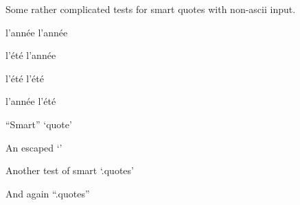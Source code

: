 
\def\mytitle{SmartQuotes Test}


Some rather complicated tests for smart quotes with non-ascii input.

l'année l'année

l'été l'année

l'été l'été

l'année l'été

``Smart'' `quote'

An escaped `\textbar{}'

Another test of smart `.quotes'

And again ``.quotes''




